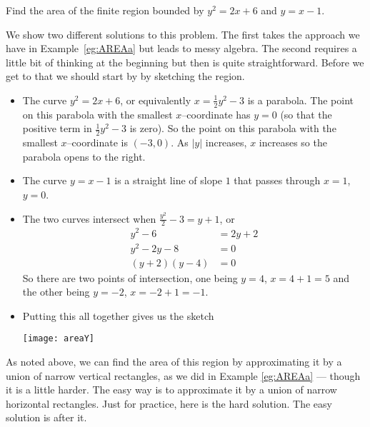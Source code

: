 \begin{eg}\label{eg:AREAb}
Find the area of the finite region bounded by $y^2=2x+6$ and
$y=x-1$.

\soln We show two different solutions to this problem. The first takes the approach
we have in  Example~\ref{eg:AREAa} but leads to messy algebra. The
second requires a little bit of thinking at the beginning but then is quite
straightforward. Before we get to that we should start by by sketching the region.
\begin{itemize}
\item The curve $y^2=2x+6$, or equivalently $x=\frac{1}{2} y^2-3$
is a parabola. The point on this parabola with the smallest $x$--coordinate
has $y=0$ (so that the positive term in $\frac{1}{2} y^2-3$ is
zero). So the point on this parabola with the smallest $x$--coordinate
is $(-3,0)$. As $|y|$ increases, $x$ increases so the parabola opens to
the right.

\item The curve $y=x-1$ is a straight line of slope $1$ that passes through
$x=1$, $y=0$.

\item The two curves intersect when $\frac{y^2}{2}-3=y+1$, or
   \begin{align*}
      y^2-6 &= 2y+2 \\
      y^2-2y-8 &= 0 \\
      (y+2)(y-4) &= 0
    \end{align*}
So there are two points of intersection, one being $y=4$, $x=4+1=5$
and the other being $y=-2$, $x=-2+1=-1$.
\item Putting this all together gives us the sketch
\begin{efig}
\begin{center}
   \texttt{[image: areaY]}
\end{center}
\end{efig}
\end{itemize}
As noted above, we can find the area of this region by approximating it by a union
of narrow vertical rectangles, as we did in Example \ref{eg:AREAa} --- though it is a
little harder. The easy way is to approximate it by a union of narrow horizontal
rectangles. Just for practice, here is the hard solution. The easy solution is after it.


\end{eg}
